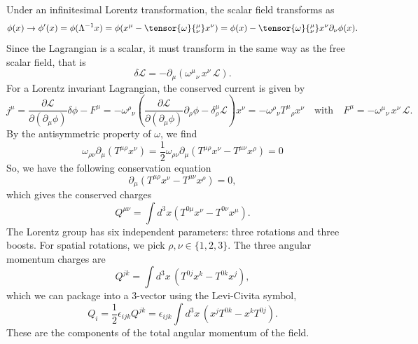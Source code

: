 \begin{solution}
    Under an infinitesimal Lorentz transformation, the scalar field transforms as
    \begin{equation}
        \phi(x) \to \phi'(x) =  \phi(\Lambda^{-1}x) = \phi(x^\mu - \tensor{\omega}{^\mu_\nu}x^\nu) = \phi(x) - \tensor{\omega}{^\mu_\nu}x^\nu\partial_\nu\phi(x).
    \end{equation}
    Since the Lagrangian is a scalar, it must transform in the same way as the free scalar field, that is
    \begin{equation}
        \delta\mathcal{L} = -\partial_\mu(\omega^\mu{}_\nu\, x^\nu\, \mathcal{L}).
    \end{equation}
    For a Lorentz invariant Lagrangian, the conserved current is given by
    \begin{equation}
        j^\mu = \frac{\partial\mathcal{L}}{\partial(\partial_\mu\phi)}\delta\phi - F^\mu = -\omega^\rho{}_\nu\left(\frac{\partial\mathcal{L}}{\partial(\partial_\mu\phi)}\partial_\rho\phi  - \delta^\mu_\rho\mathcal{L}\right)x^\nu = - \omega^\rho{}_\nu T^\mu{}_\rho x^\nu\quad \text{with} \quad F^\mu = -\omega^\mu{}_\nu\, x^\nu\, \mathcal{L}.
    \end{equation}
    By the antisymmetric property of $\omega$, we find
    \begin{equation}
        \omega_{\rho\nu}\partial_\mu(T^{\mu\rho}x^\nu) = \frac{1}2{}\omega_{\rho\nu}\partial_\mu(T^{\mu\rho}x^\nu - T^{\mu\nu}x^\rho) = 0
    \end{equation}
    So, we have the following conservation equation
    \begin{equation}
        \partial_\mu(T^{\mu\rho}x^\nu - T^{\mu\nu}x^\rho) =0,
    \end{equation}
    which gives the conserved charges
    \begin{equation}
        Q^{\mu\nu} =  \int d^3x( T^{0\mu}x^\nu -T^{0\nu}x^\mu).
    \end{equation}
    The Lorentz group has six independent parameters: three rotations and three boosts.
    For spatial rotations, we pick $\rho, \nu \in \{1,2,3\}$. The three angular momentum
    charges are
    \begin{equation}
        Q^{jk} = \int d^3x\,(T^{0j}x^k - T^{0k}x^j),
    \end{equation}
    which we can package into a 3-vector using the Levi-Civita symbol,
    \begin{equation}
        Q_i = \frac{1}{2}\epsilon_{ijk}Q^{jk} = \epsilon_{ijk}\int d^3x\,(x^j T^{0k} - x^k T^{0j}).
    \end{equation}
   These are the components of the total angular momentum of
    the field.


\end{solution}
